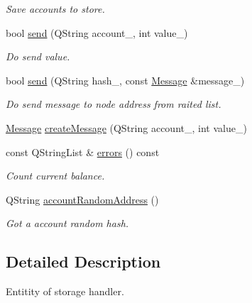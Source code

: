 \begin{DoxyCompactItemize}
\begin{DoxyCompactList}\small\item\em Save accounts to store. \end{DoxyCompactList}\item 
\mbox{\label{classeven_1_1_wallet_aa2d163dc6916f3f0464e089661fe8b8a}} 
bool \mbox{\hyperlink{classeven_1_1_wallet_aa2d163dc6916f3f0464e089661fe8b8a}{send}} (Q\+String account\+\_\+, int value\+\_\+)
\begin{DoxyCompactList}\small\item\em Do send value. \end{DoxyCompactList}\item 
\mbox{\label{classeven_1_1_wallet_a5ab0eae41be8f5db3eaf5ac0c779d962}} 
bool \mbox{\hyperlink{classeven_1_1_wallet_a5ab0eae41be8f5db3eaf5ac0c779d962}{send}} (Q\+String hash\+\_\+, const \mbox{\hyperlink{classeven_1_1_message}{Message}} \&message\+\_\+)
\begin{DoxyCompactList}\small\item\em Do send message to node address from raited list. \end{DoxyCompactList}\item 
\mbox{\hyperlink{classeven_1_1_message}{Message}} \mbox{\hyperlink{classeven_1_1_wallet_abd74f2e09f5e7f30c6b290b6ad33407d}{create\+Message}} (Q\+String account\+\_\+, int value\+\_\+)
\item 
const Q\+String\+List \& \mbox{\hyperlink{classeven_1_1_wallet_ad94dc38a6d0929c544b4037d5752e4f5}{errors}} () const
\begin{DoxyCompactList}\small\item\em Count current balance. \end{DoxyCompactList}\item 
\mbox{\label{classeven_1_1_wallet_a6d70acfe899ed00e16a51ba9d481f8d5}} 
Q\+String \mbox{\hyperlink{classeven_1_1_wallet_a6d70acfe899ed00e16a51ba9d481f8d5}{account\+Random\+Address}} ()
\begin{DoxyCompactList}\small\item\em Got a account random hash. \end{DoxyCompactList}\end{DoxyCompactItemize}


\subsection{Detailed Description}
Entitity of storage handler. 

